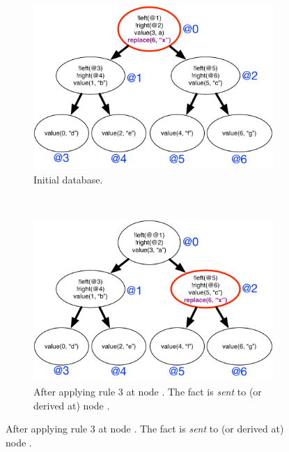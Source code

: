 \begin{figure}[h]
        \centering
        \begin{subfigure}[b]{0.5\textwidth}
                \includegraphics[width=\textwidth]{figures/btree/btree_trace1}
                \caption{Initial database.}
                \label{fig:language:btree_trace1}
        \end{subfigure}%
        ~
        \begin{subfigure}[b]{0.5\textwidth}
                \includegraphics[width=\textwidth]{figures/btree/btree_trace2}

                \caption{After applying rule 3 at node . The
                 fact is \emph{sent} to (or derived at) node
                .}


\end{subfigure}
\end{figure}
